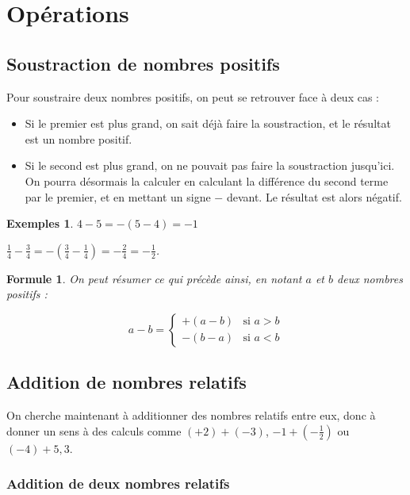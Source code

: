 \documentclass[12 pt]{article}
\theoremstyle{plain}
\newcounter{n}
\numberwithin{n}{section}
\newtheorem*{exs}{Exemples}
\newtheorem*{formule}{Formule}
\begin{document}
\section{Opérations}

\subsection{Soustraction de nombres positifs}

Pour soustraire deux nombres positifs, on peut se retrouver face à deux cas : 
\begin{itemize}
\item Si le premier est plus grand, on sait déjà faire la soustraction, et le résultat est un nombre positif. 
\item Si le second est plus grand, on ne pouvait pas faire la soustraction jusqu'ici. On pourra désormais la calculer
en calculant la différence du second terme par le premier, et en mettant un signe $-$ devant. Le résultat est alors négatif. 
\end{itemize}

\begin{exs}
$4 - 5 = - (5-4) = -1$

$\frac14 - \frac34 = - (\frac34 - \frac14) = - \frac24 = -\frac12$. 


\end{exs}

\begin{formule}
On peut résumer ce qui précède ainsi, en notant $a$ et $b$ deux nombres positifs : 

\[  a - b = \begin{cases}
+ (a-b) & \text{si $a >b$}\\
- (b-a) & \text{si $a <b$}
\end{cases}\]
\end{formule}

\subsection{Addition de nombres relatifs}

On cherche maintenant à additionner des nombres relatifs entre eux, donc à donner un sens à des calculs comme 
$(+2) +  (-3)$, $-1+ (-\frac12)$ ou $(-4) + 5,3$. 
\subsubsection{Addition de deux nombres relatifs}
\end{document}
